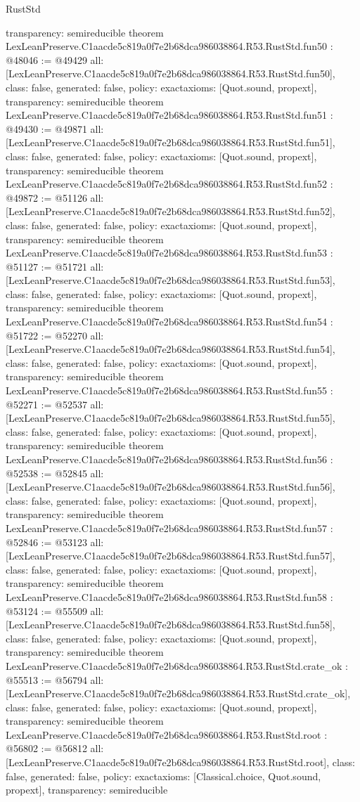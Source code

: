 \begin{lexlean}{RustStd}
\begin{coremodule}
{  transparency: semireducible
}
theorem LexLeanPreserve.C1aacde5c819a0f7e2b68dca986038864.R53.RustStd.fun50 : @48046 := @49429 {
  all: [LexLeanPreserve.C1aacde5c819a0f7e2b68dca986038864.R53.RustStd.fun50],
  class: false,
  generated: false,
  policy: exact{axioms: [Quot.sound, propext]},
  transparency: semireducible
}
theorem LexLeanPreserve.C1aacde5c819a0f7e2b68dca986038864.R53.RustStd.fun51 : @49430 := @49871 {
  all: [LexLeanPreserve.C1aacde5c819a0f7e2b68dca986038864.R53.RustStd.fun51],
  class: false,
  generated: false,
  policy: exact{axioms: [Quot.sound, propext]},
  transparency: semireducible
}
theorem LexLeanPreserve.C1aacde5c819a0f7e2b68dca986038864.R53.RustStd.fun52 : @49872 := @51126 {
  all: [LexLeanPreserve.C1aacde5c819a0f7e2b68dca986038864.R53.RustStd.fun52],
  class: false,
  generated: false,
  policy: exact{axioms: [Quot.sound, propext]},
  transparency: semireducible
}
theorem LexLeanPreserve.C1aacde5c819a0f7e2b68dca986038864.R53.RustStd.fun53 : @51127 := @51721 {
  all: [LexLeanPreserve.C1aacde5c819a0f7e2b68dca986038864.R53.RustStd.fun53],
  class: false,
  generated: false,
  policy: exact{axioms: [Quot.sound, propext]},
  transparency: semireducible
}
theorem LexLeanPreserve.C1aacde5c819a0f7e2b68dca986038864.R53.RustStd.fun54 : @51722 := @52270 {
  all: [LexLeanPreserve.C1aacde5c819a0f7e2b68dca986038864.R53.RustStd.fun54],
  class: false,
  generated: false,
  policy: exact{axioms: [Quot.sound, propext]},
  transparency: semireducible
}
theorem LexLeanPreserve.C1aacde5c819a0f7e2b68dca986038864.R53.RustStd.fun55 : @52271 := @52537 {
  all: [LexLeanPreserve.C1aacde5c819a0f7e2b68dca986038864.R53.RustStd.fun55],
  class: false,
  generated: false,
  policy: exact{axioms: [Quot.sound, propext]},
  transparency: semireducible
}
theorem LexLeanPreserve.C1aacde5c819a0f7e2b68dca986038864.R53.RustStd.fun56 : @52538 := @52845 {
  all: [LexLeanPreserve.C1aacde5c819a0f7e2b68dca986038864.R53.RustStd.fun56],
  class: false,
  generated: false,
  policy: exact{axioms: [Quot.sound, propext]},
  transparency: semireducible
}
theorem LexLeanPreserve.C1aacde5c819a0f7e2b68dca986038864.R53.RustStd.fun57 : @52846 := @53123 {
  all: [LexLeanPreserve.C1aacde5c819a0f7e2b68dca986038864.R53.RustStd.fun57],
  class: false,
  generated: false,
  policy: exact{axioms: [Quot.sound, propext]},
  transparency: semireducible
}
theorem LexLeanPreserve.C1aacde5c819a0f7e2b68dca986038864.R53.RustStd.fun58 : @53124 := @55509 {
  all: [LexLeanPreserve.C1aacde5c819a0f7e2b68dca986038864.R53.RustStd.fun58],
  class: false,
  generated: false,
  policy: exact{axioms: [Quot.sound, propext]},
  transparency: semireducible
}
theorem LexLeanPreserve.C1aacde5c819a0f7e2b68dca986038864.R53.RustStd.crate_ok : @55513 := @56794 {
  all: [LexLeanPreserve.C1aacde5c819a0f7e2b68dca986038864.R53.RustStd.crate_ok],
  class: false,
  generated: false,
  policy: exact{axioms: [Quot.sound, propext]},
  transparency: semireducible
}
theorem LexLeanPreserve.C1aacde5c819a0f7e2b68dca986038864.R53.RustStd.root : @56802 := @56812 {
  all: [LexLeanPreserve.C1aacde5c819a0f7e2b68dca986038864.R53.RustStd.root],
  class: false,
  generated: false,
  policy: exact{axioms: [Classical.choice, Quot.sound, propext]},
  transparency: semireducible
}


\end{coremodule}
\end{lexlean}
